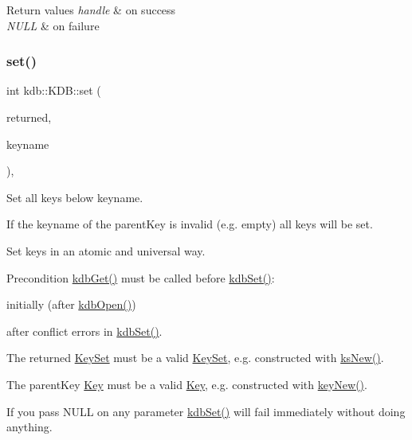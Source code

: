 \begin{DoxyRetVals}{Return values}
{\em handle} & on success \\
\hline
{\em N\+U\+LL} & on failure \\
\hline
\end{DoxyRetVals}
\mbox{\label{classkdb_1_1KDB_a29087a6a1a7de334f4e5b62ffe5d6e6e}} 
\subsubsection{\texorpdfstring{set()}{set()}\hspace{0.1cm}{\footnotesize\ttfamily [1/2]}}
{\footnotesize\ttfamily int kdb\+::\+K\+D\+B\+::set (\begin{DoxyParamCaption}\item[{\hyperlink{classkdb_1_1KeySet}{Key\+Set} \&}]{returned,  }\item[{std\+::string const \&}]{keyname }\end{DoxyParamCaption})\hspace{0.3cm}{\ttfamily [inline]}, {\ttfamily [virtual]}}



Set all keys below keyname. 

If the keyname of the parent\+Key is invalid (e.\+g. empty) all keys will be set.

Set keys in an atomic and universal way. \begin{DoxyPrecond}{Precondition}
\hyperlink{group__kdb_ga28e385fd9cb7ccfe0b2f1ed2f62453a1}{kdb\+Get()} must be called before \hyperlink{group__kdb_ga11436b058408f83d303ca5e996832bcf}{kdb\+Set()}\+:
\begin{DoxyItemize}
\item initially (after \hyperlink{group__kdb_ga6808defe5870f328dd17910aacbdc6ca}{kdb\+Open()})
\item after conflict errors in \hyperlink{group__kdb_ga11436b058408f83d303ca5e996832bcf}{kdb\+Set()}.
\end{DoxyItemize}

The {\ttfamily returned} \hyperlink{classkdb_1_1KeySet}{Key\+Set} must be a valid \hyperlink{classkdb_1_1KeySet}{Key\+Set}, e.\+g. constructed with \hyperlink{group__keyset_ga671e1aaee3ae9dc13b4834a4ddbd2c3c}{ks\+New()}.

The {\ttfamily parent\+Key} \hyperlink{classkdb_1_1Key}{Key} must be a valid \hyperlink{classkdb_1_1Key}{Key}, e.\+g. constructed with \hyperlink{group__key_gad23c65b44bf48d773759e1f9a4d43b89}{key\+New()}.
\end{DoxyPrecond}
If you pass N\+U\+LL on any parameter \hyperlink{group__kdb_ga11436b058408f83d303ca5e996832bcf}{kdb\+Set()} will fail immediately without doing anything.

